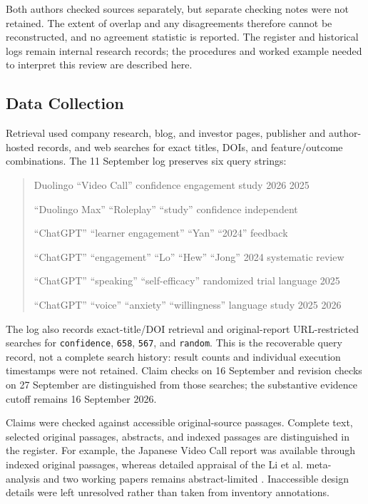 \documentclass[11pt,titlepage]{article}
\begin{document}
Both authors checked sources separately, but separate checking notes were not retained. The extent of overlap and any disagreements therefore cannot be reconstructed, and no agreement statistic is reported. The register and historical logs remain internal research records; the procedures and worked example needed to interpret this review are described here.

\subsection{Data Collection}
Retrieval used company research, blog, and investor pages, publisher and author-hosted records, and web searches for exact titles, DOIs, and feature/outcome combinations. The 11 September log preserves six query strings:
\begin{quote}
\small\raggedright
Duolingo ``Video Call'' confidence engagement study 2026 2025\par
``Duolingo Max'' ``Roleplay'' ``study'' confidence independent\par
``ChatGPT'' ``learner engagement'' ``Yan'' ``2024'' feedback\par
``ChatGPT'' ``engagement'' ``Lo'' ``Hew'' ``Jong'' 2024 systematic review\par
``ChatGPT'' ``speaking'' ``self-efficacy'' randomized trial language 2025\par
``ChatGPT'' ``voice'' ``anxiety'' ``willingness'' language study 2025 2026
\end{quote}
The log also records exact-title/DOI retrieval and original-report URL-restricted searches for \texttt{confidence}, \texttt{658}, \texttt{567}, and \texttt{random}. This is the recoverable query record, not a complete search history: result counts and individual execution timestamps were not retained. Claim checks on 16 September and revision checks on 27 September are distinguished from those searches; the substantive evidence cutoff remains 16 September 2026.

Claims were checked against accessible original-source passages. Complete text, selected original passages, abstracts, and indexed passages are distinguished in the register. For example, the Japanese Video Call report was available through indexed original passages, whereas detailed appraisal of the Li et al. meta-analysis and two working papers remains abstract-limited \parencite{kittredge2025video,liMeta2025,harrison2025,espinosa2026}. Inaccessible design details were left unresolved rather than taken from inventory annotations.
\end{document}
